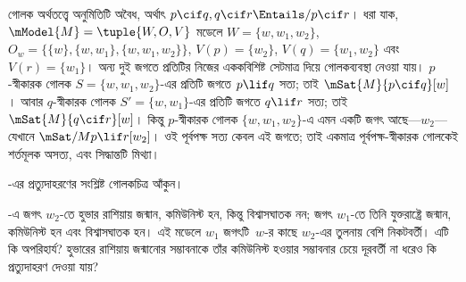 \documentclass[../../../include/open-logic-section]{subfiles}
\begin{document}
\begin{ex}
  গোলক অর্থতত্ত্বে অনুমিতিটি অবৈধ, অর্থাৎ $p
  \cif q, q \cif r \Entails/ p \cif r$। ধরা যাক,
  $\mModel{M} = \tuple{W, O, V}$ মডেলে $W = \{w, w_1, w_2\}$,
  $O_w = \{\{w\}, \{w, w_1\}, \{w, w_1, w_2\}\}$,
  $V(p) = \{w_2\}$, $V(q) = \{w_1, w_2\}$
  এবং $V(r) = \{w_1\}$।
  অন্য দুই জগতে প্রতিটির নিজের এককবিশিষ্ট সেটমাত্র দিয়ে
  গোলকব্যবস্থা নেওয়া যায়। $p$-স্বীকারক গোলক
  $S = \{w, w_1, w_2\}$-এর প্রতিটি জগতে $p \lif q$
  সত্য; তাই $\mSat{M}{p \cif q}[w]$। আবার $q$-স্বীকারক গোলক
  $S' = \{w, w_1\}$-এর প্রতিটি জগতে $q \lif r$
  সত্য; তাই $\mSat{M}{q \cif r}[w]$। কিন্তু $p$-স্বীকারক
  গোলক $\{w, w_1, w_2\}$-এ এমন একটি জগৎ আছে—$w_2$—যেখানে
  $\mSat/{M}{p \lif r}[w_2]$। ওই পূর্বপক্ষ সত্য
  কেবল এই জগতে; তাই একমাত্র পূর্বপক্ষ-স্বীকারক গোলকেই
  শর্তমূলক অসত্য, এবং সিদ্ধান্তটি মিথ্যা।
\end{ex}

\begin{prob}
  -এর প্রত্যুদাহরণের
  সংশ্লিষ্ট গোলকচিত্র আঁকুন।
\end{prob}

\begin{prob}
  -এ জগৎ $w_2$-তে
  হুভার রাশিয়ায় জন্মান, কমিউনিস্ট হন, কিন্তু বিশ্বাসঘাতক নন;
  জগৎ $w_1$-তে তিনি যুক্তরাষ্ট্রে জন্মান, কমিউনিস্ট হন এবং
  বিশ্বাসঘাতক হন। এই মডেলে $w_1$ জগৎটি~$w$-র কাছে
  $w_2$-এর তুলনায় বেশি নিকটবর্তী। এটি কি অপরিহার্য?
  হুভারের রাশিয়ায় জন্মানোর সম্ভাবনাকে তাঁর কমিউনিস্ট
  হওয়ার সম্ভাবনার চেয়ে দূরবর্তী না ধরেও কি প্রত্যুদাহরণ
  দেওয়া যায়?
\end{prob}
\end{document}
